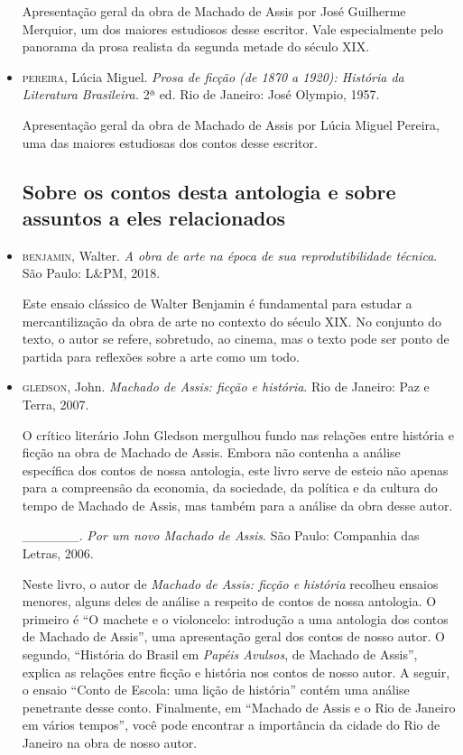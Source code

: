 \documentclass[11pt]{extarticle}
\begin{document}
\begin{itemize}
Apresentação geral da obra de Machado de Assis por José Guilherme
Merquior, um dos maiores estudiosos desse escritor. Vale especialmente
pelo panorama da prosa realista da segunda metade do século XIX.

\item \textsc{pereira}, Lúcia Miguel. \textit{Prosa de ficção (de 1870 a 1920):
História da Literatura Brasileira.} 2ª ed. Rio de Janeiro: José Olympio,
1957.

Apresentação geral da obra de Machado de Assis por Lúcia Miguel Pereira,
uma das maiores estudiosas dos contos desse escritor.

\subsection{Sobre os contos desta antologia e sobre assuntos a eles relacionados}

\item \textsc{benjamin}, Walter. \textit{A obra de arte na época de sua
reprodutibilidade técnica}. São Paulo: L\&PM, 2018.

Este ensaio clássico de Walter Benjamin é fundamental para estudar a
mercantilização da obra de arte no contexto do século XIX. No conjunto
do texto, o autor se refere, sobretudo, ao cinema, mas o texto pode ser
ponto de partida para reflexões sobre a arte como um todo.

\item \textsc{gledson}, John. \textit{Machado de Assis: ficção e história}. Rio de
Janeiro: Paz e Terra, 2007.

O crítico literário John Gledson mergulhou fundo nas relações entre
história e ficção na obra de Machado de Assis. Embora não contenha a
análise específica dos contos de nossa antologia, este livro serve de
esteio não apenas para a compreensão da economia, da sociedade, da
política e da cultura do tempo de Machado de Assis, mas também para a
análise da obra desse autor.

\_\_\_\_\_\_. \textit{Por um novo Machado de Assis}. São Paulo:
Companhia das Letras, 2006.

Neste livro, o autor de \emph{Machado de Assis: ficção e história}
recolheu ensaios menores, alguns deles de análise a respeito de contos
de nossa antologia. O primeiro é ``O machete e o violoncelo: introdução
a uma antologia dos contos de Machado de Assis'', uma apresentação geral
dos contos de nosso autor. O segundo, ``História do Brasil em
\emph{Papéis Avulsos}, de Machado de Assis'', explica as relações entre
ficção e história nos contos de nosso autor. A seguir, o ensaio ``Conto
de Escola: uma lição de história'' contém uma análise penetrante desse
conto. Finalmente, em ``Machado de Assis e o Rio de Janeiro em vários
tempos'', você pode encontrar a importância da cidade do Rio de Janeiro
na obra de nosso autor.


\end{itemize}
\end{document}
